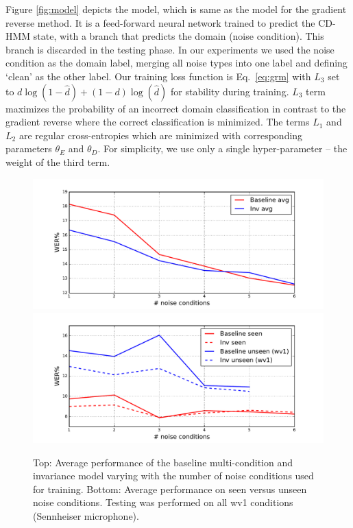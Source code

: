 \documentclass[a4paper]{article}
\begin{document}
Figure \ref{fig:model} depicts the model, which is same as the model for the 
gradient reverse method. It is a feed-forward neural network trained to predict 
the CD-HMM state, with a branch that predicts the domain (noise condition). This 
branch is discarded in the testing phase. In our experiments we
used the noise condition as the domain label, merging all noise types into one label
and defining `clean' as the other label. Our training loss function is Eq.~\ref{eq:grm} with 
$L_3$ set to $d\log(1 - \hat{d}) + (1-d)\log(\hat{d})$ for stability during training. 
$L_3$ term maximizes the probability
of an incorrect domain classification in contrast to the gradient reverse where the 
correct classification is minimized.
The terms $L_1$ and $L_2$ are 
regular cross-entropies which are minimized with corresponding parameters $\theta_E$ and $\theta_D$.
For simplicity, we use only a single hyper-parameter -- the weight of the third term.

\begin{figure}
    \centering
    \includegraphics[width=\linewidth]{wer_avg.pdf}
    \includegraphics[width=\linewidth]{wer_seen_unseen.pdf}
    \caption{Top: Average performance of the baseline multi-condition and invariance model varying with  the number of noise
        conditions used for training. Bottom: Average performance on seen versus unseen noise conditions.
        Testing was performed on all wv1 conditions (Sennheiser microphone).
        }
    \label{fig:results}
\end{figure}
\end{document}
